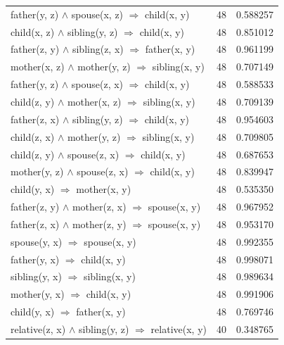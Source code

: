 \begin{longtable}{lrr}
       father(y, z) $\wedge$ spouse(x, z)   $\Rightarrow$ child(x, y) &           48 &        0.588257 \\
       child(x, z) $\wedge$ sibling(y, z)   $\Rightarrow$ child(x, y) &           48 &        0.851012 \\
     father(z, y) $\wedge$ sibling(z, x)   $\Rightarrow$ father(x, y) &           48 &        0.961199 \\
     mother(x, z) $\wedge$ mother(y, z)   $\Rightarrow$ sibling(x, y) &           48 &        0.707149 \\
       father(y, z) $\wedge$ spouse(z, x)   $\Rightarrow$ child(x, y) &           48 &        0.588533 \\
      child(z, y) $\wedge$ mother(x, z)   $\Rightarrow$ sibling(x, y) &           48 &        0.709139 \\
      father(z, x) $\wedge$ sibling(y, z)   $\Rightarrow$ child(x, y) &           48 &        0.954603 \\
      child(z, x) $\wedge$ mother(y, z)   $\Rightarrow$ sibling(x, y) &           48 &        0.709805 \\
        child(z, y) $\wedge$ spouse(z, x)   $\Rightarrow$ child(x, y) &           48 &        0.687653 \\
       mother(y, z) $\wedge$ spouse(z, x)   $\Rightarrow$ child(x, y) &           48 &        0.839947 \\
                       child(y, x)   $\Rightarrow$ mother(x, y) &           48 &        0.535350 \\
      father(z, y) $\wedge$ mother(z, x)   $\Rightarrow$ spouse(x, y) &           48 &        0.967952 \\
      father(z, x) $\wedge$ mother(z, y)   $\Rightarrow$ spouse(x, y) &           48 &        0.953170 \\
                      spouse(y, x)   $\Rightarrow$ spouse(x, y) &           48 &        0.992355 \\
                       father(y, x)   $\Rightarrow$ child(x, y) &           48 &        0.998071 \\
                    sibling(y, x)   $\Rightarrow$ sibling(x, y) &           48 &        0.989634 \\
                       mother(y, x)   $\Rightarrow$ child(x, y) &           48 &        0.991906 \\
                       child(y, x)   $\Rightarrow$ father(x, y) &           48 &        0.769746 \\
 relative(z, x) $\wedge$ sibling(y, z)   $\Rightarrow$ relative(x, y) &           40 &        0.348765 \\

\end{longtable}
